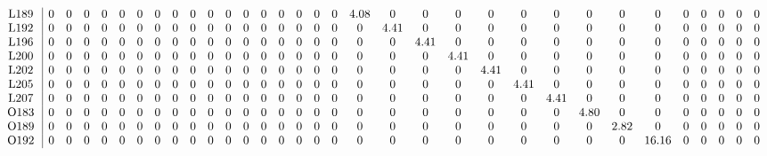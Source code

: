 \begin{table}[H]
\begin{center}
\begin{math}
\begin{array}{c|cccccccccccccccccccccccccccccccc}
\mathrm{L189} \hspace*{2pt} &  0 &  0 &  0 &  0 &  0 &  0 &  0 &  0 &  0 &  0 &  0 &  0 &  0 &  0 &  0 &  0 &  0 &       4.08 &  0 &  0 &  0 &  0 &  0 &  0 &  0 &  0 &  0 &  0 &  0 &  0 &  0 &  0 \\
\mathrm{L192} \hspace*{2pt} &  0 &  0 &  0 &  0 &  0 &  0 &  0 &  0 &  0 &  0 &  0 &  0 &  0 &  0 &  0 &  0 &  0 &  0 &       4.41 &  0 &  0 &  0 &  0 &  0 &  0 &  0 &  0 &  0 &  0 &  0 &  0 &  0 \\
\mathrm{L196} \hspace*{2pt} &  0 &  0 &  0 &  0 &  0 &  0 &  0 &  0 &  0 &  0 &  0 &  0 &  0 &  0 &  0 &  0 &  0 &  0 &  0 &       4.41 &  0 &  0 &  0 &  0 &  0 &  0 &  0 &  0 &  0 &  0 &  0 &  0 \\
\mathrm{L200} \hspace*{2pt} &  0 &  0 &  0 &  0 &  0 &  0 &  0 &  0 &  0 &  0 &  0 &  0 &  0 &  0 &  0 &  0 &  0 &  0 &  0 &  0 &       4.41 &  0 &  0 &  0 &  0 &  0 &  0 &  0 &  0 &  0 &  0 &  0 \\
\mathrm{L202} \hspace*{2pt} &  0 &  0 &  0 &  0 &  0 &  0 &  0 &  0 &  0 &  0 &  0 &  0 &  0 &  0 &  0 &  0 &  0 &  0 &  0 &  0 &  0 &       4.41 &  0 &  0 &  0 &  0 &  0 &  0 &  0 &  0 &  0 &  0 \\
\mathrm{L205} \hspace*{2pt} &  0 &  0 &  0 &  0 &  0 &  0 &  0 &  0 &  0 &  0 &  0 &  0 &  0 &  0 &  0 &  0 &  0 &  0 &  0 &  0 &  0 &  0 &       4.41 &  0 &  0 &  0 &  0 &  0 &  0 &  0 &  0 &  0 \\
\mathrm{L207} \hspace*{2pt} &  0 &  0 &  0 &  0 &  0 &  0 &  0 &  0 &  0 &  0 &  0 &  0 &  0 &  0 &  0 &  0 &  0 &  0 &  0 &  0 &  0 &  0 &  0 &       4.41 &  0 &  0 &  0 &  0 &  0 &  0 &  0 &  0 \\
\mathrm{O183} \hspace*{2pt} &  0 &  0 &  0 &  0 &  0 &  0 &  0 &  0 &  0 &  0 &  0 &  0 &  0 &  0 &  0 &  0 &  0 &  0 &  0 &  0 &  0 &  0 &  0 &  0 &       4.80 &  0 &  0 &  0 &  0 &  0 &  0 &  0 \\
\mathrm{O189} \hspace*{2pt} &  0 &  0 &  0 &  0 &  0 &  0 &  0 &  0 &  0 &  0 &  0 &  0 &  0 &  0 &  0 &  0 &  0 &  0 &  0 &  0 &  0 &  0 &  0 &  0 &  0 &       2.82 &  0 &  0 &  0 &  0 &  0 &  0 \\
\mathrm{O192} \hspace*{2pt} &  0 &  0 &  0 &  0 &  0 &  0 &  0 &  0 &  0 &  0 &  0 &  0 &  0 &  0 &  0 &  0 &  0 &  0 &  0 &  0 &  0 &  0 &  0 &  0 &  0 &  0 &      16.16 &  0 &  0 &  0 &  0 &  0 \\

\end{array}
\end{math}
\end{center}
\end{table}
